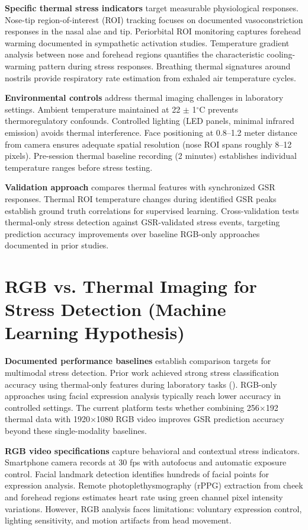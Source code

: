 \textbf{Specific thermal stress indicators} target measurable physiological responses. Nose-tip region-of-interest (ROI) tracking focuses on documented vasoconstriction responses in the nasal alae and tip. Periorbital ROI monitoring captures forehead warming documented in sympathetic activation studies. Temperature gradient analysis between nose and forehead regions quantifies the characteristic cooling-warming pattern during stress responses. Breathing thermal signatures around nostrils provide respiratory rate estimation from exhaled air temperature cycles.

\textbf{Environmental controls} address thermal imaging challenges in laboratory settings. Ambient temperature maintained at 22 $\pm$ 1$^\circ$C prevents thermoregulatory confounds. Controlled lighting (LED panels, minimal infrared emission) avoids thermal interference. Face positioning at 0.8--1.2 meter distance from camera ensures adequate spatial resolution (nose ROI spans roughly 8--12 pixels). Pre-session thermal baseline recording (2 minutes) establishes individual temperature ranges before stress testing.

\textbf{Validation approach} compares thermal features with synchronized GSR responses. Thermal ROI temperature changes during identified GSR peaks establish ground truth correlations for supervised learning. Cross-validation tests thermal-only stress detection against GSR-validated stress events, targeting prediction accuracy improvements over baseline RGB-only approaches documented in prior studies.


\section{RGB vs. Thermal Imaging for Stress Detection (Machine Learning Hypothesis)}
\textbf{Documented performance baselines} establish comparison targets for multimodal stress detection. Prior work achieved strong stress classification accuracy using thermal-only features during laboratory tasks (\citep{ref5}). RGB-only approaches using facial expression analysis typically reach lower accuracy in controlled settings. The current platform tests whether combining 256$\times$192 thermal data with 1920$\times$1080 RGB video improves GSR prediction accuracy beyond these single-modality baselines.

\textbf{RGB video specifications} capture behavioral and contextual stress indicators. Smartphone camera records at 30 fps with autofocus and automatic exposure control. Facial landmark detection identifies hundreds of facial points for expression analysis. Remote photoplethysmography (rPPG) extraction from cheek and forehead regions estimates heart rate using green channel pixel intensity variations. However, RGB analysis faces limitations: voluntary expression control, lighting sensitivity, and motion artifacts from head movement.

